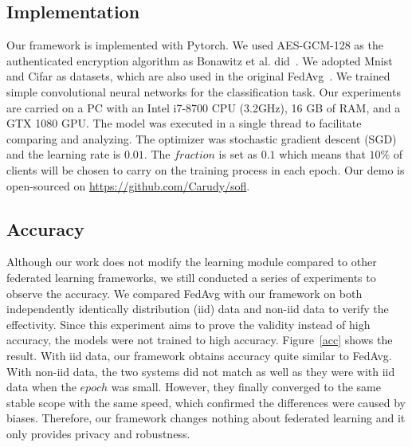 \subsection{Implementation}
Our framework is implemented with Pytorch. We used AES-GCM-128 as the authenticated encryption algorithm as Bonawitz et al. did~\cite{Practical}. We adopted Mnist and Cifar as datasets, which are also used in the original FedAvg~\cite{mcmahan2016communicationefficient}. We trained simple convolutional neural networks for the classification task. Our experiments are carried on a PC with an Intel i7-8700 CPU (3.2GHz), 16 GB of RAM, and a GTX 1080 GPU. The model was executed in a single thread to facilitate comparing and analyzing. The optimizer was stochastic gradient descent (SGD) and the learning rate is $0.01$. The $fraction$ is set as $0.1$ which means that $10\%$ of clients will be chosen to carry on the training process in each epoch. Our demo is open-sourced on \url{https://github.com/Carudy/sofl}.


\subsection{Accuracy}
Although our work does not modify the learning module compared to other federated learning frameworks, we still conducted a series of experiments to observe the accuracy. We compared FedAvg with our framework on both independently identically distribution (iid) data and non-iid data to verify the effectivity. Since this experiment aims to prove the validity instead of high accuracy, the models were not trained to high accuracy. Figure~\ref{acc} shows the result. With iid data, our framework obtains accuracy quite similar to FedAvg. With non-iid data, the two systems did not match as well as they were with iid data when the $epoch$ was small. However, they finally converged to the same stable scope with the same speed, which confirmed the differences were caused by biases. Therefore, our framework changes nothing about federated learning and it only provides privacy and robustness. 

